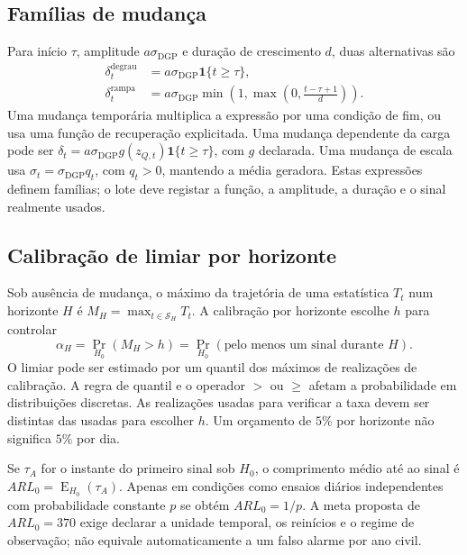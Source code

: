 \subsection{Famílias de mudança}
\label{sec:mat-injecoes}
Para início $\tau$, amplitude $a\sigma_{\mathrm{DGP}}$ e duração de
crescimento $d$, duas alternativas são
\begin{align}
\delta_t^{\mathrm{degrau}}&=a\sigma_{\mathrm{DGP}}\mathbf1\{t\geq\tau\},\label{eq:mat-degrau}\\
\delta_t^{\mathrm{rampa}}&=a\sigma_{\mathrm{DGP}}
\min\!\left(1,\max\!\left(0,\frac{t-\tau+1}{d}\right)\right).
\label{eq:mat-rampa}
\end{align}
Uma mudança temporária multiplica a expressão por uma condição de fim, ou usa uma função de recuperação explicitada. Uma mudança dependente da carga pode ser $\delta_t=a\sigma_{\mathrm{DGP}}g(z_{Q,t})\mathbf1\{t\geq\tau\}$, com $g$ declarada. Uma mudança de escala usa $\sigma_t=\sigma_{\mathrm{DGP}}q_t$, com $q_t>0$, mantendo a média geradora. Estas expressões definem famílias; o lote deve registar a função, a amplitude, a duração e o sinal realmente usados.

\subsection{Calibração de limiar por horizonte}
\label{sec:mat-limiares}
Sob ausência de mudança, o máximo da trajetória de uma estatística $T_t$ num horizonte $H$ é $M_H=\max_{t\in\mathcal S_H}T_t$. A calibração por horizonte escolhe $h$ para controlar
\begin{equation}
\alpha_H=\Pr_{H_0}(M_H>h)
=\Pr_{H_0}(\text{pelo menos um sinal durante }H).
\label{eq:mat-fap-horizonte}
\end{equation}
O limiar pode ser estimado por um quantil dos máximos de realizações de calibração. A regra de quantil e o operador $>$ ou $\geq$ afetam a probabilidade em distribuições discretas. As realizações usadas para verificar a taxa devem ser distintas das usadas para escolher $h$. Um orçamento de $5\%$ por horizonte não significa $5\%$ por dia.

Se $\tau_A$ for o instante do primeiro sinal sob $H_0$, o comprimento médio até ao sinal é $ARL_0=\operatorname{E}_{H_0}(\tau_A)$. Apenas em condições como ensaios diários independentes com probabilidade constante $p$ se obtém $ARL_0=1/p$. A meta proposta de $ARL_0=370$ exige declarar a unidade temporal, os reinícios e o regime de observação; não equivale automaticamente a um falso alarme por ano civil.

